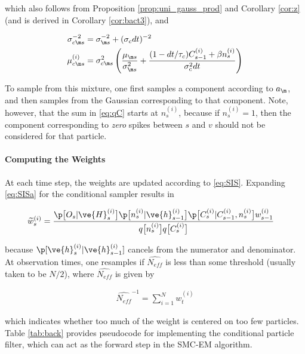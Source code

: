 \noindent which also follows from Proposition \ref{prop:uni_gauss_prod} and Corollary \ref{cor:z} (and is derived in Corollary \ref{cor:bact3}), and

\begin{align}
\sigma_{c\m s}^{-2} &= \sigma_{\m s}^{-2} + (\sigma_c dt)^{-2}\\
\mu_{c\m s}^{(i)} &=\sigma_{c\m s}^2 \left( \frac{\mu_{\m s}} {\sigma_{\m s}^2} + \frac{(1-dt/\tau_c) C_{s-1}^{(i)} + \beta n_s^{(i)}}{\sigma_c^2 dt}\right)
\end{align}

To sample from this mixture, one first samples a component according to $a_\m$, and then samples from the Gaussian corresponding to that component.  Note, however, that the sum in \eqref{eq:qC} starts at $n_s^{(i)}$, because if $n_s^{(i)}=1$, then the component corresponding to \emph{zero} spikes between $s$ and $v$ should not be considered for that particle.

\paragraph{Computing the Weights}

At each time step, the weights are updated according to \eqref{eq:SIS}.  Expanding \eqref{eq:SISa} for the conditional sampler results in

\begin{align} \label{eq:cond_w}
\widetilde{w}_s^{(i)} &= \frac{\p\big[O_s | \ve{H}_s^{(i)}\big]
\p\big[n_s^{(i)} | \ve{h}_{s-1}^{(i)}\big] \p\big[C_s^{(i)} | C_{s-1}^{(i)}, n_s^{(i)}\big] w_{s-1}^{(i)}}{q\big[n_s^{(i)}\big] q\big[C_s^{(i)}\big]}
\end{align}

\noindent because $\p[\ve{h}_s^{(i)} | \ve{h}_{s-1}^{(i)}]$ cancels from the numerator and denominator.  At observation times, one resamples if $\widehat{N_{eff}}$ is less than some threshold (usually taken to be $N/2$), where $\widehat{N_{eff}}$ is given by

\begin{align}
\widehat{N_{eff}}^{-1} = \sum_{i=1}^N w_t^{(i)}
\end{align}

\noindent which indicates whether too much of the weight is centered on too few particles\cite{Rubin88}.  Table \ref{tab:back} provides pseudocode for implementing the conditional particle filter, which can act as the forward step in the SMC-EM algorithm.

